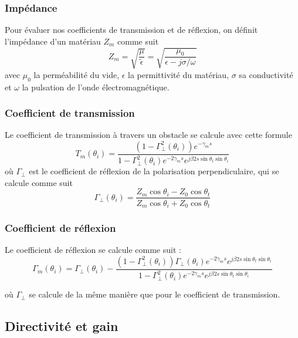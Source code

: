 \subsubsection*{Imp{\'e}dance}

Pour {\'e}valuer nos coefficients de transmission et de r{\'e}flexion, on
d{\'e}finit l'imp{\'e}dance d'un mat{\'e}riau $Z_m$ comme suit
\[ Z_m = \sqrt{\frac{\mu}{\tilde{\epsilon}}} = \sqrt{\frac{\mu_0}{\epsilon - j
   \sigma / \omega}} \]
avec $\mu_0$ la perm{\'e}abilit{\'e} du vide, $\epsilon$ la permittivit{\'e}
du mat{\'e}riau, $\sigma$ sa conductivit{\'e} et $\omega$ la pulsation de
l'onde {\'e}lectromagn{\'e}tique.

\subsubsection*{Coefficient de transmission}

Le coefficient de transmission {\`a} travers un obstacle se calcule avec cette
formule
\[ T_m (\theta_i) = \frac{(1 - \Gamma_{\perp}^2 (\theta_i)) e^{- \gamma_m
   s}}{1 - \Gamma_{\perp}^2 (\theta_i) e^{- 2 \gamma_m s} e^{j \beta 2 s \sin
   \theta_t \sin \theta_i}} \]
o{\`u} $\Gamma_{\perp}$ est le coefficient de r{\'e}flexion de la polarisation
perpendiculaire, qui se calcule comme suit
\[ \Gamma_{\perp} (\theta_i) = \frac{Z_m \cos \theta_i - Z_0 \cos
   \theta_t}{Z_m \cos \theta_i + Z_0 \cos \theta_t} \]

\subsubsection*{Coefficient de r{\'e}flexion}

Le coefficient de r{\'e}flexion se calcule comme suit :
\[ \Gamma_m (\theta_i) = \Gamma_{\perp} (\theta_i) - \frac{(1 -
   \Gamma_{\perp}^2 (\theta_i)) \Gamma_{\perp} (\theta_i) e^{- 2 \gamma_m s}
   e^{j \beta 2 s \sin \theta_t \sin \theta_i}}{1 - \Gamma_{\perp}^2
   (\theta_i) e^{- 2 \gamma_m s} e^{j \beta 2 s \sin \theta_t \sin \theta_i}}
\]


o{\`u} $\Gamma_{\perp}$ se calcule de la m{\^e}me mani{\`e}re que pour le
coefficient de transmission.

\subsection{Directivit{\'e} et gain}

